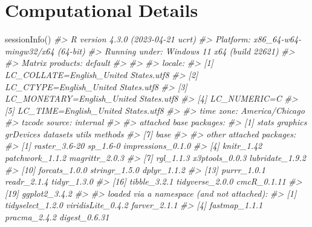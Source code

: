 \documentclass[11pt,]{isuthesis}
\newenvironment{Shaded}{\begin{snugshade}}{\end{snugshade}}
\newcommand{\CommentTok}[1]{\textcolor[rgb]{0.56,0.35,0.01}{\textit{#1}}}
\newcommand{\FunctionTok}[1]{\textcolor[rgb]{0.00,0.00,0.00}{#1}}
\newcommand{\NormalTok}[1]{#1}
\begin{document}
\hypertarget{computational-details-1}{%
\chapter*{Computational Details}\label{computational-details-1}}

\begin{Shaded}
\begin{Highlighting}[]
\FunctionTok{sessionInfo}\NormalTok{()}
\CommentTok{\#\textgreater{} R version 4.3.0 (2023{-}04{-}21 ucrt)}
\CommentTok{\#\textgreater{} Platform: x86\_64{-}w64{-}mingw32/x64 (64{-}bit)}
\CommentTok{\#\textgreater{} Running under: Windows 11 x64 (build 22621)}
\CommentTok{\#\textgreater{} }
\CommentTok{\#\textgreater{} Matrix products: default}
\CommentTok{\#\textgreater{} }
\CommentTok{\#\textgreater{} }
\CommentTok{\#\textgreater{} locale:}
\CommentTok{\#\textgreater{} [1] LC\_COLLATE=English\_United States.utf8 }
\CommentTok{\#\textgreater{} [2] LC\_CTYPE=English\_United States.utf8   }
\CommentTok{\#\textgreater{} [3] LC\_MONETARY=English\_United States.utf8}
\CommentTok{\#\textgreater{} [4] LC\_NUMERIC=C                          }
\CommentTok{\#\textgreater{} [5] LC\_TIME=English\_United States.utf8    }
\CommentTok{\#\textgreater{} }
\CommentTok{\#\textgreater{} time zone: America/Chicago}
\CommentTok{\#\textgreater{} tzcode source: internal}
\CommentTok{\#\textgreater{} }
\CommentTok{\#\textgreater{} attached base packages:}
\CommentTok{\#\textgreater{} [1] stats     graphics  grDevices datasets  utils     methods  }
\CommentTok{\#\textgreater{} [7] base     }
\CommentTok{\#\textgreater{} }
\CommentTok{\#\textgreater{} other attached packages:}
\CommentTok{\#\textgreater{}  [1] raster\_3.6{-}20     sp\_1.6{-}0          impressions\_0.1.0}
\CommentTok{\#\textgreater{}  [4] knitr\_1.42        patchwork\_1.1.2   magrittr\_2.0.3   }
\CommentTok{\#\textgreater{}  [7] rgl\_1.1.3         x3ptools\_0.0.3    lubridate\_1.9.2  }
\CommentTok{\#\textgreater{} [10] forcats\_1.0.0     stringr\_1.5.0     dplyr\_1.1.2      }
\CommentTok{\#\textgreater{} [13] purrr\_1.0.1       readr\_2.1.4       tidyr\_1.3.0      }
\CommentTok{\#\textgreater{} [16] tibble\_3.2.1      tidyverse\_2.0.0   cmcR\_0.1.11      }
\CommentTok{\#\textgreater{} [19] ggplot2\_3.4.2    }
\CommentTok{\#\textgreater{} }
\CommentTok{\#\textgreater{} loaded via a namespace (and not attached):}
\CommentTok{\#\textgreater{}  [1] tidyselect\_1.2.0   viridisLite\_0.4.2  farver\_2.1.1      }
\CommentTok{\#\textgreater{}  [4] fastmap\_1.1.1      pracma\_2.4.2       digest\_0.6.31     }

\end{Highlighting}
\end{Shaded}
\end{document}
